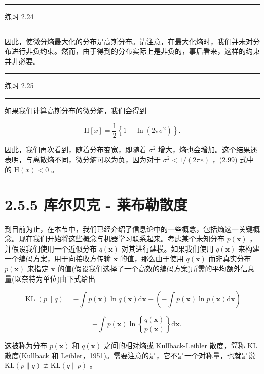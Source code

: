 \documentclass[10pt]{article}
\newcommand{\HRule}{\begin{center}\rule{0.9\linewidth}{0.2mm}\end{center}}
\begin{document}
\HRule

练习 2.24

\HRule

因此，使微分熵最大化的分布是高斯分布。请注意，在最大化熵时，我们并未对分布进行非负约束。然而，由于得到的分布实际上是非负的，事后看来，这样的约束并非必要。

\HRule

练习 2.25

\HRule

如果我们计算高斯分布的微分熵，我们会得到

\[
\mathrm{H}\left\lbrack  x\right\rbrack   = \frac{1}{2}\left\{  {1 + \ln \left( {{2\pi }{\sigma }^{2}}\right) }\right\}  . \tag{2.99}
\]

因此，我们再次看到，随着分布变宽，即随着 \({\sigma }^{2}\) 增大，熵也会增加。这个结果还表明，与离散熵不同，微分熵可以为负，因为对于 \({\sigma }^{2} < 1/\left( {2\pi e}\right)\) ，(2.99) 式中的 \(\mathrm{H}\left( x\right)  < 0\) 。

\section*{2.5.5 库尔贝克 - 莱布勒散度}

到目前为止，在本节中，我们已经介绍了信息论中的一些概念，包括熵这一关键概念。现在我们开始将这些概念与机器学习联系起来。考虑某个未知分布 \(p\left( \mathbf{x}\right)\) ，并假设我们使用一个近似分布 \(q\left( \mathbf{x}\right)\) 对其进行建模。如果我们使用 \(q\left( \mathbf{x}\right)\) 来构建一个编码方案，用于向接收方传输 \(\mathbf{x}\) 的值，那么由于使用 \(q\left( \mathbf{x}\right)\) 而非真实分布 \(p\left( \mathbf{x}\right)\) 来指定 \(\mathbf{x}\) 的值(假设我们选择了一个高效的编码方案)所需的平均额外信息量(以奈特为单位)由下式给出

\[
\operatorname{KL}\left( {p\parallel q}\right)  =  - \int p\left( \mathbf{x}\right) \ln q\left( \mathbf{x}\right) \mathrm{d}\mathbf{x} - \left( {-\int p\left( \mathbf{x}\right) \ln p\left( \mathbf{x}\right) \mathrm{d}\mathbf{x}}\right)
\]

\[
=  - \int p\left( \mathbf{x}\right) \ln \left\{  \frac{q\left( \mathbf{x}\right) }{p\left( \mathbf{x}\right) }\right\}  \mathrm{d}\mathbf{x}. \tag{2.100}
\]

这被称为分布 \(p\left( \mathbf{x}\right)\) 和 \(q\left( \mathbf{x}\right)\) 之间的相对熵或 Kullback-Leibler 散度，简称 KL 散度(Kullback 和 Leibler，1951)。需要注意的是，它不是一个对称量，也就是说 \(\mathrm{{KL}}\left( {p\parallel q}\right)  ≢ \mathrm{{KL}}\left( {q\parallel p}\right)\) 。
\end{document}
